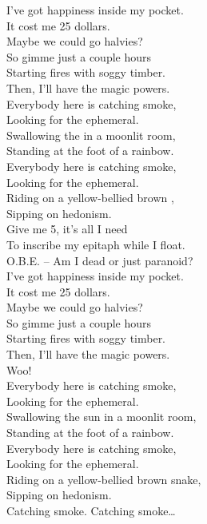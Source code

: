 I've got happiness inside my pocket. \\
It cost me 25 dollars. \\
Maybe we could go halvies? \\
So gimme just a couple hours \\
Starting fires with soggy timber. \\
Then, I'll have the magic powers. \\

Everybody here is catching smoke, \\
Looking for the ephemeral. \\
Swallowing the  in a moonlit room, \\
Standing at the foot of a rainbow. \\
Everybody here is catching smoke, \\
Looking for the ephemeral. \\
Riding on a yellow-bellied brown , \\
Sipping on hedonism. \\

Give me 5, it's all I need \\
To inscribe my epitaph while I float. \\ 
O.B.E. -- Am I dead or just paranoid? \\

I've got happiness inside my pocket. \\
It cost me 25 dollars. \\
Maybe we could go halvies? \\
So gimme just a couple hours \\
Starting fires with soggy timber. \\
Then, I'll have the magic powers. \\
Woo! \\

Everybody here is catching smoke, \\
Looking for the ephemeral. \\
Swallowing the sun in a moonlit room, \\
Standing at the foot of a rainbow. \\
Everybody here is catching smoke, \\
Looking for the ephemeral. \\
Riding on a yellow-bellied brown snake, \\
Sipping on hedonism. \\

Catching smoke. Catching smoke… \\

